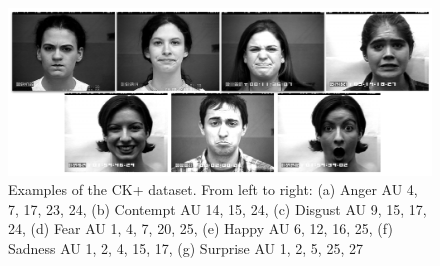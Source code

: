  \begin{figure}[H]
    \begin{center}
    \includegraphics[width=0.6 \textwidth]{images/Cohn_kanade.pdf}
    \end{center}
    \caption{Examples of the CK+ dataset. From left to right: (a) Anger AU 4, 7, 17, 23, 24, (b) Contempt AU 14, 15, 24, (c) Disgust AU 9, 15, 17, 24, (d) Fear AU 1, 4, 7, 20, 25, (e) Happy AU 6, 12, 16, 25, (f) Sadness AU 1, 2, 4, 15, 17, (g) Surprise AU 1, 2, 5, 25, 27} \label{fig:Cohn_kanade}
\end{figure}

